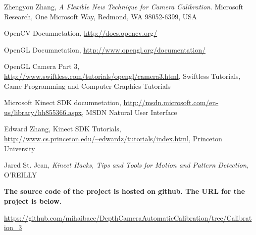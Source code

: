 \begin{thebibliography}{9}

  Zhengyou Zhang,
  \emph{A Flexible New Technique for Camera Calibration}.
  Microsoft Research, One Microsoft Way, Redmond, WA 98052-6399, USA
  
	OpenCV Documnetation,
	\url{http://docs.opencv.org/}
	
	OpenGL Documnetation,
	\url{http://www.opengl.org/documentation/}	
	
	OpenGL Camera Part 3,
	\url{http://www.swiftless.com/tutorials/opengl/camera3.html},
	Swiftless Tutorials, Game Programming and Computer Graphics Tutorials	
	
	Microsoft Kinect SDK documnetation,
	\url{http://msdn.microsoft.com/en-us/library/hh855366.aspx},
	MSDN Natural User Interface
	
	Edward Zhang, Kinect SDK Tutorials, 
	\url{http://www.cs.princeton.edu/~edwardz/tutorials/index.html},
	Princeton University
	
	Jared St. Jean,
	\emph{Kinect Hacks, Tips and Tools for Motion and Pattern Detection},
	O'REILLY
	
	

\end{thebibliography}

{\bf The source code of the project is hosted on github. The URL for the project is below.}

\url{https://github.com/mihaibace/DepthCameraAutomaticCalibration/tree/Calibration_3}